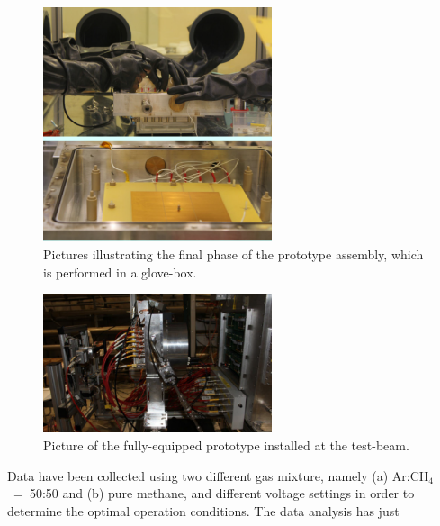 \begin{enumerate}
\begin{figure}
			\begin{center}
			\includegraphics[width=0.6\textwidth]			
                {INFN_plots/assembly-in_glovebox}
				\caption{\label{fig:assembly-in_glovebox}
                	Pictures illustrating the final phase of the 
       						 prototype
               	assembly, which is performed in a glove-box.
               	 }
			\end{center}
            \end{figure}%
\begin{figure}
			\begin{center}
			\includegraphics[width=0.6\textwidth]
                			{INFN_plots/mini-pad_at_test-beam}
				\caption{\label{fig:mini-pad_at_test-beam}
                Picture of the fully-equipped prototype 
                		installed at the
                test-beam.
                }
			\end{center}
            \end{figure} 
       Data have been collected using two different gas mixture, 
       namely (a) Ar:CH$_4$~=~50:50 and (b) pure methane, and different voltage settings in order 
       to determine the 
       optimal operation conditions. The data analysis has just 

\end{enumerate}

